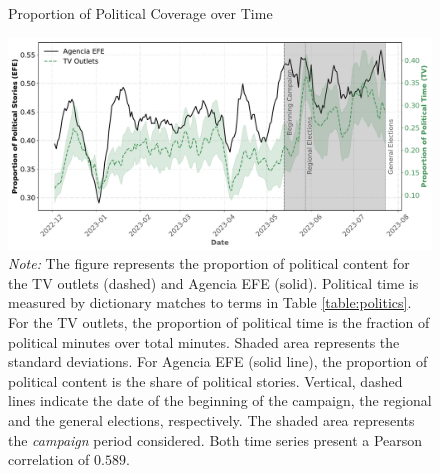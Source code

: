 \documentclass[12pt]{article}
\begin{document}
	
	
	\begin{figure}[!htb]
		\caption{Proportion of Political Coverage over Time}
		\centering
		\includegraphics[width=150mm]{figures/political_words_bothv2}
		\caption*{\small \textit{Note:} The figure represents the proportion of political content for the TV outlets (dashed) and Agencia EFE (solid). Political time is measured by dictionary matches to terms in Table \ref{table:politics}. For the TV outlets, the proportion of political time is the fraction of political minutes over total minutes. Shaded area represents the standard deviations. For Agencia EFE (solid line), the proportion of political content is the share of political stories. Vertical, dashed lines indicate the date of the beginning of the campaign, the regional and the general elections, respectively. The shaded area represents the \textit{campaign} period considered. Both time series present a Pearson correlation of $0.589$.}
		\label{fig:coverage}
	\end{figure}
	

	
\end{document}
